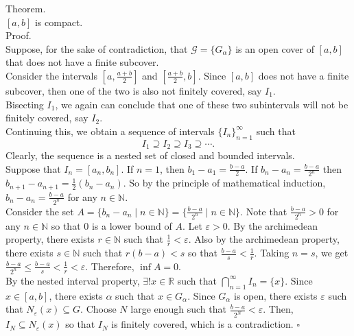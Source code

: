 \documentclass[twocolumn]{article}
\newcommand{\qed}{$\square$}
\let\eps\varepsilon
\newcommand{\naturals}{\mathbb{N}}
\newcommand{\reals}{\mathbb{R}}
\begin{document}
Theorem. \\
$[a, b]$ is compact. \\
Proof. \\
Suppose, for the sake of contradiction, that $\mathcal{G} = \{ G_\alpha \}$ is an open cover of $[a, b]$ that does not have a finite subcover. \\
Consider the intervals $[a, \frac{a + b}{2}]$ and $[\frac{a + b}{2}, b]$. Since $[a, b]$ does not have a finite subcover, then one of the two is also not finitely covered, say $I_1$. \\
Bisecting $I_1$, we again can conclude that one of these two subintervals will not be finitely covered, say $I_2$. \\
Continuing this, we obtain a sequence of intervals $\{ I_n \}_{n = 1}^\infty$ such that
$$I_1 \supseteq I_2 \supseteq I_3 \supseteq \cdots \text{.}$$
Clearly, the sequence is a nested set of closed and bounded intervals. \\
Suppose that $I_n = [a_n, b_n]$. If $n = 1$, then $b_1 - a_1 = \frac{b - a}{2}$. If $b_n - a_n = \frac{b - a}{2^n}$ then $b_{n + 1} - a_{n + 1} = \frac{1}{2}(b_n - a_n)$. So by the principle of mathematical induction, $b_n - a_n = \frac{b - a}{2^n}$ for any $n \in \naturals$. \\
Consider the set $A = \{ b_n - a_n \mid n \in \naturals \} = \{ \frac{b - a}{2^n} \mid n \in \naturals \}$. Note that $\frac{b - a}{2^n} > 0$ for any $n \in \naturals$ so that $0$ is a lower bound of $A$. Let $\eps > 0$. By the archimedean property, there exists $r \in \naturals$ such that $\frac{1}{r} < \eps$. Also by the archimedean property, there exists $s \in \naturals$ such that $r(b - a) < s$ so that $\frac{b - a}{s} < \frac{1}{r}$. Taking $n = s$, we get $\frac{b - a}{2^n} \leq \frac{b - a}{s} < \frac{1}{r} < \eps$. Therefore, $\inf A = 0$. \\
By the nested interval property, $\exists! x \in \reals$ such that $\bigcap_{n = 1}^\infty I_n = \{ x \}$. Since $x \in [a, b]$, there exists $\alpha$ such that $x \in G_\alpha$. Since $G_\alpha$ is open, there exists $\eps$ such that $N_\eps(x) \subseteq G$. Choose $N$ large enough such that $\frac{b - a}{2^N} < \eps$. Then, $I_N \subseteq N_\eps(x)$ so that $I_N$ is finitely covered, which is a contradiction. \qed \\
\end{document}

